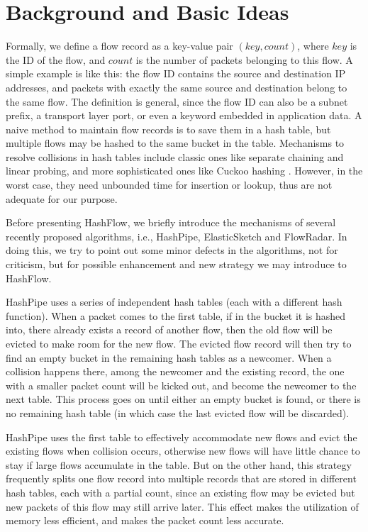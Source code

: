 \section{Background and Basic Ideas}
\label{section:background}
Formally, we define a flow record as a key-value pair $(key, count)$, 
where $key$ is the ID of the flow, and $count$ is the number of packets belonging to this flow. 
A simple example is like this: the flow ID contains the source and destination IP addresses, 
and packets with exactly the same source and destination belong to the same flow. 
The definition is general, since the flow ID can also be a subnet prefix, a transport layer port, 
or even a keyword embedded in application data. A naive method to maintain flow records is to 
save them in a hash table, but multiple flows may be hashed to the same bucket in the table. 
Mechanisms to resolve collisions in hash tables include classic ones like separate chaining 
and linear probing, and more sophisticated ones like Cuckoo hashing \cite{pagh_cuckoo_2004}.
However, in the worst case, they need unbounded time for insertion or lookup, thus are not 
adequate for our purpose. 

Before presenting HashFlow, we briefly introduce the mechanisms of several recently proposed algorithms,
i.e., HashPipe\cite{sivaraman_heavy-hitter_2017}, ElasticSketch\cite{yang_elastic_2018} and FlowRadar\cite{li_flowradar:_2016}.
In doing this, we try to point out some minor defects in the algorithms, not for criticism, but for possible 
enhancement and new strategy we may introduce to HashFlow. 

HashPipe\cite{sivaraman_heavy-hitter_2017} uses a series of independent hash tables (each with a different hash function).
When a packet comes to the first table, if in the bucket it is hashed into, there already exists a record of another flow, 
then the old flow will be evicted to make room for the new flow. The evicted flow record will then try to find an empty bucket 
in the remaining hash tables as a newcomer. When a collision happens there, among the newcomer and the existing record, 
the one with a smaller packet count will be kicked out, and become the newcomer to the next table. This process goes on 
until either an empty bucket is found, or there is no remaining hash table (in which case the last evicted flow will be discarded). 

HashPipe uses the first table to effectively accommodate new flows and evict the existing flows when collision occurs, otherwise new flows will have little chance to stay if large flows accumulate in the table. But on the other hand, this strategy frequently 
splits one flow record into multiple records that are stored in different hash tables, each with a partial count, 
since an existing flow may be evicted but new packets of this flow may still arrive later. 
This effect makes the utilization of memory less efficient, and makes the packet count less accurate. 

